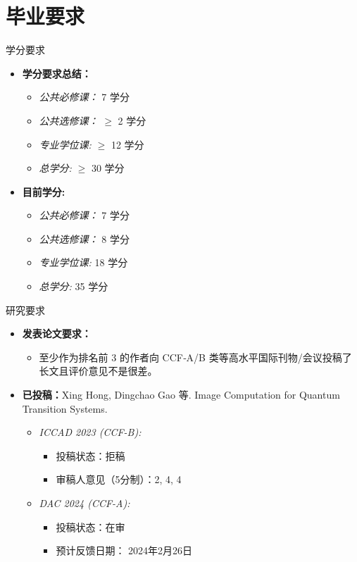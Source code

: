 \documentclass[aspectratio=1610]{ctexbeamer}
\begin{document}
\section{毕业要求}
\begin{frame}{学分要求}
    \begin{itemize}
        \item \textbf{学分要求总结：}
        \begin{itemize}
            \item \textit{公共必修课：} 7 学分
            \item \textit{公共选修课：} $\geq$ 2 学分
            \item \textit{专业学位课:} $\geq$ 12 学分
            \item \textit{总学分:} $\geq$ 30 学分
        \end{itemize}
        \item \textbf{目前学分:}
        \begin{itemize}
            \item \textit{公共必修课：} 7 学分
            \item \textit{公共选修课：} 8 学分
            \item \textit{专业学位课:} 18 学分
            \item \textit{总学分:} 35 学分
        \end{itemize}
    \end{itemize}
\end{frame}
\begin{frame}{研究要求}
    \begin{itemize}
        \item \textbf{发表论文要求：}
        \begin{itemize}
            \item 至少作为排名前 3 的作者向 CCF‐A/B 类等高水平国际刊物/会议投稿了长文且评价意见不是很差。
        \end{itemize}
        \item \textbf{已投稿：}Xing Hong, Dingchao Gao 等. Image Computation for Quantum Transition Systems.
        \begin{itemize}
            \item \textit{ICCAD 2023 (CCF-B):}
            \begin{itemize}
                \item 投稿状态：拒稿
                \item 审稿人意见（5分制）：2, 4, 4
            \end{itemize}
            \item \textit{DAC 2024 (CCF-A):}
            \begin{itemize}
                \item 投稿状态：在审
                \item 预计反馈日期： 2024年2月26日
            \end{itemize}
        \end{itemize}
    \end{itemize}
\end{frame}
\end{document}
